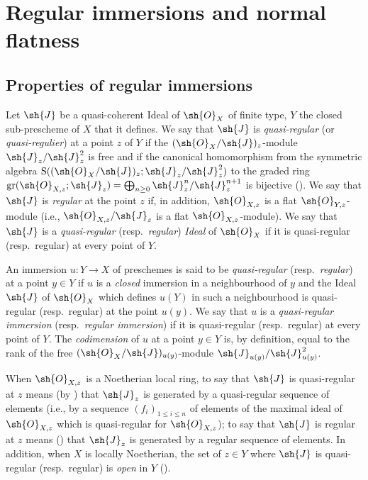 \section{Regular immersions and normal flatness}
\label{section:IV.19}


\subsection{Properties of regular immersions}
\label{subsection:IV.19.1}


\begin{env}[19.1.1]
\label{IV.19.1.1}
Let $\sh{J}$ be a quasi-coherent Ideal of $\sh{O}_X$ of finite type, $Y$ the closed sub-prescheme of $X$ that it defines.
We say that $\sh{J}$ is \emph{quasi-regular} (or \emph{quasi-regulier}) at a point $z$ of $Y$ if the $(\sh{O}_X/\sh{J})_z$-module $\sh{J}_z/\sh{J}_z^2$ is free and if the canonical homomorphism from the symmetric algebra $\operatorname{S}((\sh{O}_X/\sh{J})_z;\sh{J}_z/\sh{J}_z^2)$ to the graded ring $\operatorname{gr}(\sh{O}_{X,z};\sh{J}_z)=\bigoplus_{n\geq 0}\sh{J}_z^n/\sh{J}_z^{n+1}$ is bijective ().
We say that $\sh{J}$ is \emph{regular} at the point $z$ if, in addition, $\sh{O}_{X,z}$ is a flat $\sh{O}_{Y,z}$-module (i.e., $\sh{O}_{X,z}/\sh{J}_z$ is a flat $\sh{O}_{X,z}$-module).
We say that $\sh{J}$ is a \emph{quasi-regular} (resp.\ \emph{regular}) \emph{Ideal} of $\sh{O}_X$ if it is quasi-regular (resp.\ regular) at every point of $Y$.
\end{env}

\begin{env}[19.1.2]
\label{IV.19.1.2}
An immersion $u:Y\to X$ of preschemes is said to be \emph{quasi-regular} (resp.\ \emph{regular}) at a point $y\in Y$ if $u$ is a \emph{closed} immersion in a neighbourhood of $y$ and the Ideal $\sh{J}$ of $\sh{O}_X$ which defines $u(Y)$ in such a neighbourhood is quasi-regular (resp.\ regular) at the point $u(y)$.
We say that $u$ is a \emph{quasi-regular immersion} (resp.\ \emph{regular immersion}) if it is quasi-regular (resp.\ regular) at every point of $Y$.
The \emph{codimension} of $u$ at a point $y\in Y$ is, by definition, equal to the rank of the free $(\sh{O}_X/\sh{J})_{u(y)}$-module $\sh{J}_{u(y)}/\sh{J}_{u(y)}^2$.
\end{env}

\begin{env}[19.1.3]
\label{IV.19.1.3}
When $\sh{O}_{X,z}$ is a Noetherian local ring, to say that $\sh{J}$ is quasi-regular at $z$ means (by ) that $\sh{J}_z$ is generated by a quasi-regular sequence of elements (i.e., by a sequence $(f_i)_{1\leq i\leq n}$ of elements of the maximal ideal of $\sh{O}_{X,z}$ which is quasi-regular for $\sh{O}_{X,z}$);
to say that $\sh{J}$ is regular at $z$ means () that $\sh{J}_z$ is generated by a regular sequence of elements.
In addition, when $X$ is locally Noetherian, the set of $z\in Y$ where $\sh{J}$ is quasi-regular (resp.\ regular) is \emph{open} in $Y$ ().
\end{env}

